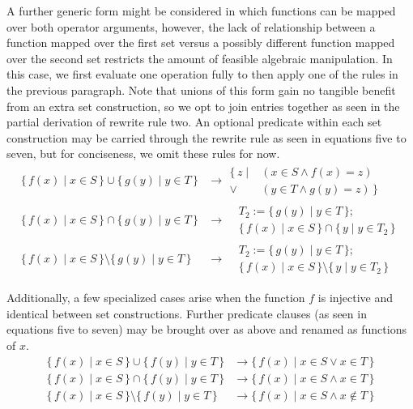 \documentclass{article}
\newcommand{\Set}[2]{%
  \{\, #1 \mid #2 \, \}%
}
\begin{document}
A further generic form might be considered in which functions can be mapped over both operator arguments, however, the lack of relationship between a function mapped over the first set versus a possibly different function mapped over the second set restricts the amount of feasible algebraic manipulation. In this case, we first evaluate one operation fully to then apply one of the rules in the previous paragraph. Note that unions of this form gain no tangible benefit from an extra set construction, so we opt to join entries together as seen in the partial derivation of rewrite rule two. An optional predicate within each set construction may be carried through the rewrite rule as seen in equations five to seven, but for conciseness, we omit these rules for now.
\begin{align}
  \Set{f(x)}{x \in S} \cup \Set{g(y)}{y \in T} &\rightarrow
    \begin{split}
      \Set{z}{&(x \in S \land f(x) = z) \\\lor &(y \in T \land g(y) = z)}
    \end{split}\\
  \Set{f(x)}{x \in S} \cap \Set{g(y)}{y \in T} &\rightarrow
    \begin{split}
      &T_2 := \Set{g(y)}{y \in T};\\
      &\Set{f(x)}{x \in S} \cap \Set{y}{y \in T_2}
    \end{split}\\
  \Set{f(x)}{x \in S} \setminus \Set{g(y)}{y \in T} &\rightarrow
    \begin{split}
      &T_2 := \Set{g(y)}{y \in T};\\
      &\Set{f(x)}{x \in S} \setminus \Set{y}{y \in T_2}
    \end{split}
\end{align}

Additionally, a few specialized cases arise when the function $f$ is injective and identical between set constructions. Further predicate clauses (as seen in equations five to seven) may be brought over as above and renamed as functions of $x$.
\begin{align}
  \Set{f(x)}{x \in S} \cup \Set{f(y)}{y \in T} &\rightarrow \Set{f(x)}{x \in S \lor x \in T}\\
  \Set{f(x)}{x \in S} \cap \Set{f(y)}{y \in T} &\rightarrow \Set{f(x)}{x \in S \land x \in T}\\
  \Set{f(x)}{x \in S} \setminus \Set{f(y)}{y \in T} &\rightarrow \Set{f(x)}{x \in S \land x \notin T}
\end{align}
\end{document}
